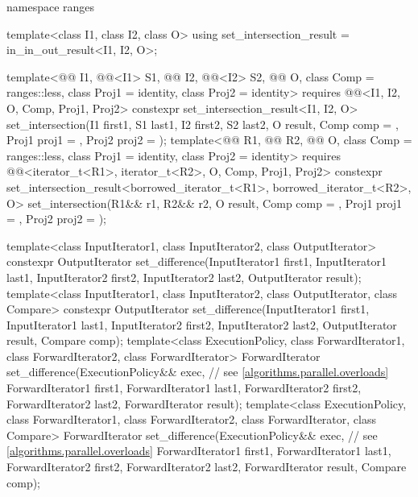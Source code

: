 \begin{codeblock}
{  namespace ranges {
    template<class I1, class I2, class O>
      using set_intersection_result = in_in_out_result<I1, I2, O>;

    template<@@ I1, @@<I1> S1, @@ I2, @@<I2> S2,
             @@ O, class Comp = ranges::less,
             class Proj1 = identity, class Proj2 = identity>
      requires @@<I1, I2, O, Comp, Proj1, Proj2>
      constexpr set_intersection_result<I1, I2, O>
        set_intersection(I1 first1, S1 last1, I2 first2, S2 last2, O result,
                         Comp comp = {}, Proj1 proj1 = {}, Proj2 proj2 = {});
    template<@@ R1, @@ R2, @@ O,
             class Comp = ranges::less, class Proj1 = identity, class Proj2 = identity>
      requires @@<iterator_t<R1>, iterator_t<R2>, O, Comp, Proj1, Proj2>
      constexpr set_intersection_result<borrowed_iterator_t<R1>, borrowed_iterator_t<R2>, O>
        set_intersection(R1&& r1, R2&& r2, O result,
                         Comp comp = {}, Proj1 proj1 = {}, Proj2 proj2 = {});
  }

  template<class InputIterator1, class InputIterator2, class OutputIterator>
    constexpr OutputIterator
      set_difference(InputIterator1 first1, InputIterator1 last1,
                     InputIterator2 first2, InputIterator2 last2,
                     OutputIterator result);
  template<class InputIterator1, class InputIterator2, class OutputIterator, class Compare>
    constexpr OutputIterator
      set_difference(InputIterator1 first1, InputIterator1 last1,
                     InputIterator2 first2, InputIterator2 last2,
                     OutputIterator result, Compare comp);
  template<class ExecutionPolicy, class ForwardIterator1, class ForwardIterator2,
           class ForwardIterator>
    ForwardIterator
      set_difference(ExecutionPolicy&& exec,                    // see \ref{algorithms.parallel.overloads}
                     ForwardIterator1 first1, ForwardIterator1 last1,
                     ForwardIterator2 first2, ForwardIterator2 last2,
                     ForwardIterator result);
  template<class ExecutionPolicy, class ForwardIterator1, class ForwardIterator2,
           class ForwardIterator, class Compare>
    ForwardIterator
      set_difference(ExecutionPolicy&& exec,                    // see \ref{algorithms.parallel.overloads}
                     ForwardIterator1 first1, ForwardIterator1 last1,
                     ForwardIterator2 first2, ForwardIterator2 last2,
                     ForwardIterator result, Compare comp);

}
\end{codeblock}
